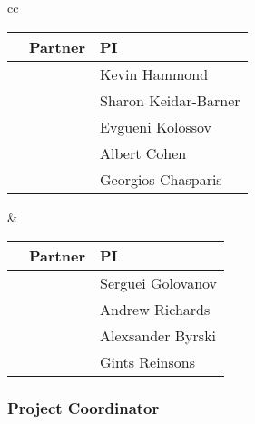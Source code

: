 \documentclass[a4paper,11pt]{article}
\begin{document}

\begin{center}
\begin{tabular}{cc}
\begin{tabular}{|l|l|l|}\hline
& \textbf{Partner} & \textbf{PI} \\ \hline
\addtocounter{partic}{1}
\thepartic & \participantshort{\thepartic} &  Kevin Hammond \\\hline
\addtocounter{partic}{1}
\thepartic & \participantshort{\thepartic} &  Sharon Keidar-Barner \\\hline
\addtocounter{partic}{1}
\thepartic & \participantshort{\thepartic} &  Evgueni Kolossov \\\hline
\addtocounter{partic}{1}
\thepartic & \participantshort{\thepartic} &  Albert Cohen \\\hline
\addtocounter{partic}{1}
\thepartic & \participantshort{\thepartic} &  Georgios Chasparis \\\hline
\end{tabular}
\quad\quad&\quad\quad
\begin{tabular}{|l|l|l|}\hline
& \textbf{Partner} & \textbf{PI} \\ \hline
\addtocounter{partic}{1}
\thepartic & \participantshort{\thepartic} & Serguei Golovanov \\\hline
\addtocounter{partic}{1}
\thepartic & \participantshort{\thepartic} & Andrew Richards \\\hline
\addtocounter{partic}{1}
\thepartic & \participantshort{\thepartic} & Alexsander Byrski \\\hline
\addtocounter{partic}{1}
\thepartic & \participantshort{\thepartic} & Gints Reinsons \\\hline
\end{tabular}
\end{tabular}
\end{center}

\vspace{12pt}
\subsubsection*{Project Coordinator}
\vspace{-6pt}
\end{document}
